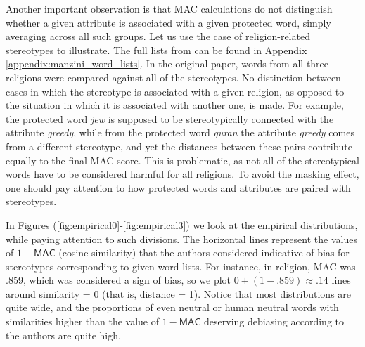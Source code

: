 \documentclass{clv3}
\begin{document}
Another important observation is that \textsf{MAC} calculations do not
distinguish whether a given attribute is associated with a given
protected word, simply averaging across all such groups. Let us use the
case of religion-related stereotypes to illustrate. The full lists from
\citep{Manzini2019blackToCriminal} can be found in Appendix \ref{appendix:manzini_word_lists}. In
the original paper, words from all three religions were compared against
all of the stereotypes. No distinction between cases in which the
stereotype is associated with a given religion, as opposed to the
situation in which it is associated with another one, is made. For
example, the protected word \emph{jew} is supposed to be stereotypically
connected with the attribute \emph{greedy}, while from the protected
word \emph{quran} the attribute \emph{greedy} comes from a different
stereotype, and yet the distances between these pairs contribute equally
to the final \textsf{MAC} score. This is problematic, as not all of the
stereotypical words have to be considered harmful for all 
religions. To avoid the masking effect, one should pay attention to how
protected words and attributes are paired with stereotypes.

In Figures (\ref{fig:empirical0}-\ref{fig:empirical3}) we look at the
empirical distributions, while paying attention to such divisions. The
horizontal lines represent the values of \(1 - \mathsf{MAC}\) (cosine similarity) that the authors considered indicative of bias for stereotypes corresponding to given word lists. For instance, in religion,
\textsf{MAC} was .859, which was considered a sign of bias, so we plot
\(0\pm (1-.859)\approx .14\) lines around similarity = 0 (that is,
distance = 1). Notice that most distributions are quite wide, and the
proportions of even neutral or human neutral words with similarities
higher than the value of \(1 - \mathsf{MAC}\) deserving debiasing
according to the authors are quite high.
\end{document}
